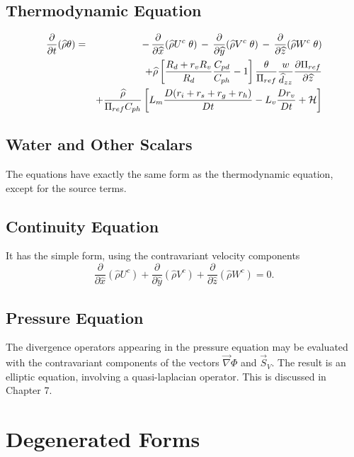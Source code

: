 \subsection{Thermodynamic Equation}

\begin{eqnarray}
\dfrac{\partial}{\partial t}(\widehat{\rho} \theta) &=& \, - \,
 \dfrac{\partial }{\partial \widehat{x}} (\widehat{\rho} U^{c } \;   \theta)
 \, - \, \dfrac{\partial }{\partial \widehat{y}} (\widehat{\rho} V^{c }  \;  \theta )
 \, - \, \dfrac{\partial }{\partial \widehat{z}} (\widehat{\rho} W^{c }  \;
 \theta) \nonumber \\ & &
+\widehat{\rho} \left[ {R_d+r_vR_v\over R_d}{C_{pd} \over C_{ph}}-1 \right]
{\theta \over \Pi_{ref}} {w \over \widehat{d}_{zz} }
 {\partial \Pi_{ref} \over \partial \widehat{z}}
\nonumber \\ & &
+ {\widehat{\rho}\over \Pi_{ref} C_{ph}} \left[
 L_m {D(r_i+r_s+r_g+r_h)\over Dt} - L_v {Dr_v\over Dt} + {\cal H}  \right]
\end{eqnarray}

\subsection{Water and Other Scalars}
The equations have exactly the same form as the thermodynamic equation,
except for the source terms.

\subsection{Continuity Equation}
It has the simple form, using the contravariant velocity components
\begin{equation}
\dfrac{\partial }{\partial \widehat{x}} (\widehat{\rho} U^{c })
+ \dfrac{\partial }{\partial \widehat{y}} (\widehat{\rho} V^{c })
+ \dfrac{\partial }{\partial \widehat{z}} (\widehat{\rho} W^{c }) =0.
\end{equation}

\subsection{Pressure Equation}
The divergence operators appearing in the pressure equation may be
evaluated with the contravariant components of the vectors $\vec{\nabla}\Phi$
and $\vec{S}_V$. The result is an elliptic equation, involving a quasi-laplacian
operator. This is discussed in Chapter 7.

\section{Degenerated Forms}

